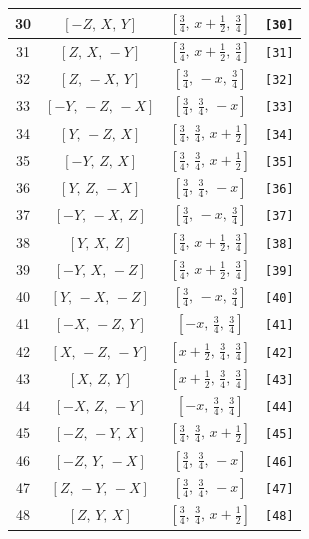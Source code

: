 \documentclass[fleqn,8pt]{jsarticle}
\begin{document}
\begin{longtable}{cccc}
30 & $\left[ - Z,\, X,\, Y \right]$ & $\left[ \frac{3}{4},\, x + \frac{1}{2},\, \frac{3}{4} \right]$ & {\tt [30]} \\ \hline
31 & $\left[ Z,\, X,\, - Y \right]$ & $\left[ \frac{3}{4},\, x + \frac{1}{2},\, \frac{3}{4} \right]$ & {\tt [31]} \\ \hline
32 & $\left[ Z,\, - X,\, Y \right]$ & $\left[ \frac{3}{4},\, - x,\, \frac{3}{4} \right]$ & {\tt [32]} \\ \hline
33 & $\left[ - Y,\, - Z,\, - X \right]$ & $\left[ \frac{3}{4},\, \frac{3}{4},\, - x \right]$ & {\tt [33]} \\ \hline
34 & $\left[ Y,\, - Z,\, X \right]$ & $\left[ \frac{3}{4},\, \frac{3}{4},\, x + \frac{1}{2} \right]$ & {\tt [34]} \\ \hline
35 & $\left[ - Y,\, Z,\, X \right]$ & $\left[ \frac{3}{4},\, \frac{3}{4},\, x + \frac{1}{2} \right]$ & {\tt [35]} \\ \hline
36 & $\left[ Y,\, Z,\, - X \right]$ & $\left[ \frac{3}{4},\, \frac{3}{4},\, - x \right]$ & {\tt [36]} \\ \hline
37 & $\left[ - Y,\, - X,\, Z \right]$ & $\left[ \frac{3}{4},\, - x,\, \frac{3}{4} \right]$ & {\tt [37]} \\ \hline
38 & $\left[ Y,\, X,\, Z \right]$ & $\left[ \frac{3}{4},\, x + \frac{1}{2},\, \frac{3}{4} \right]$ & {\tt [38]} \\ \hline
39 & $\left[ - Y,\, X,\, - Z \right]$ & $\left[ \frac{3}{4},\, x + \frac{1}{2},\, \frac{3}{4} \right]$ & {\tt [39]} \\ \hline
40 & $\left[ Y,\, - X,\, - Z \right]$ & $\left[ \frac{3}{4},\, - x,\, \frac{3}{4} \right]$ & {\tt [40]} \\ \hline
41 & $\left[ - X,\, - Z,\, Y \right]$ & $\left[ - x,\, \frac{3}{4},\, \frac{3}{4} \right]$ & {\tt [41]} \\ \hline
42 & $\left[ X,\, - Z,\, - Y \right]$ & $\left[ x + \frac{1}{2},\, \frac{3}{4},\, \frac{3}{4} \right]$ & {\tt [42]} \\ \hline
43 & $\left[ X,\, Z,\, Y \right]$ & $\left[ x + \frac{1}{2},\, \frac{3}{4},\, \frac{3}{4} \right]$ & {\tt [43]} \\ \hline
44 & $\left[ - X,\, Z,\, - Y \right]$ & $\left[ - x,\, \frac{3}{4},\, \frac{3}{4} \right]$ & {\tt [44]} \\ \hline
45 & $\left[ - Z,\, - Y,\, X \right]$ & $\left[ \frac{3}{4},\, \frac{3}{4},\, x + \frac{1}{2} \right]$ & {\tt [45]} \\ \hline
46 & $\left[ - Z,\, Y,\, - X \right]$ & $\left[ \frac{3}{4},\, \frac{3}{4},\, - x \right]$ & {\tt [46]} \\ \hline
47 & $\left[ Z,\, - Y,\, - X \right]$ & $\left[ \frac{3}{4},\, \frac{3}{4},\, - x \right]$ & {\tt [47]} \\ \hline
48 & $\left[ Z,\, Y,\, X \right]$ & $\left[ \frac{3}{4},\, \frac{3}{4},\, x + \frac{1}{2} \right]$ & {\tt [48]} \\
\end{longtable}
\end{document}
